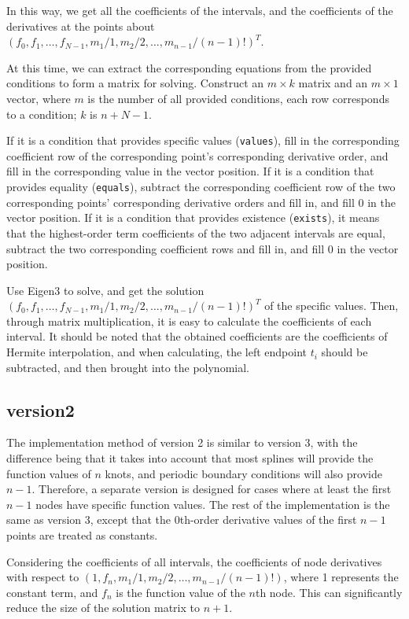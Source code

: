 \documentclass[a4paper]{article}
\begin{document}
In this way, we get all the coefficients of the intervals, and the coefficients of the derivatives at the points about \((f_0, f_1, \dots, f_{N-1}, m_1/1, m_2/2, \dots, m_{n-1}/(n-1)!)^T\).

At this time, we can extract the corresponding equations from the provided conditions to form a matrix for solving. Construct an \(m \times k\) matrix and an \(m \times 1\) vector, where \(m\) is the number of all provided conditions, each row corresponds to a condition; \(k\) is \(n + N - 1\).

If it is a condition that provides specific values (\texttt{values}), fill in the corresponding coefficient row of the corresponding point's corresponding derivative order, and fill in the corresponding value in the vector position. If it is a condition that provides equality (\texttt{equals}), subtract the corresponding coefficient row of the two corresponding points' corresponding derivative orders and fill in, and fill 0 in the vector position. If it is a condition that provides existence (\texttt{exists}), it means that the highest-order term coefficients of the two adjacent intervals are equal, subtract the two corresponding coefficient rows and fill in, and fill 0 in the vector position.

Use Eigen3 to solve, and get the solution \((f_0, f_1, \dots, f_{N-1}, m_1/1, m_2/2, \dots, m_{n-1}/(n-1)!)^T\) of the specific values. Then, through matrix multiplication, it is easy to calculate the coefficients of each interval. It should be noted that the obtained coefficients are the coefficients of Hermite interpolation, and when calculating, the left endpoint \(t_i\) should be subtracted, and then brought into the polynomial.

\subsection*{version2}

The implementation method of version 2 is similar to version 3, with the difference being that it takes into account that most splines will provide the function values of $n$ knots, and periodic boundary conditions will also provide $n-1$. Therefore, a separate version is designed for cases where at least the first $n-1$ nodes have specific function values. The rest of the implementation is the same as version 3, except that the 0th-order derivative values of the first $n-1$ points are treated as constants.

Considering the coefficients of all intervals, the coefficients of node derivatives with respect to $(1, f_n, m_1/1, m_2/2, \dots, m_{n-1}/(n-1)!)$, where 1 represents the constant term, and $f_n$ is the function value of the $n$th node. This can significantly reduce the size of the solution matrix to $n + 1$.
\end{document}
